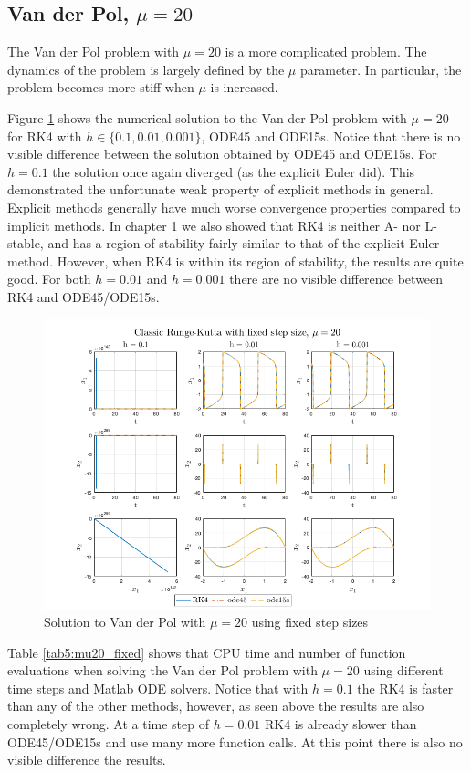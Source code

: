 \subsection{Van der Pol, $\mu = 20$}
The Van der Pol problem with $\mu = 20$ is a more complicated problem. The dynamics of the problem is largely defined by the $\mu$ parameter. In particular, the problem becomes more stiff when $\mu$ is increased.

Figure \ref{fig5:fixed_mu20} shows the numerical solution to the Van der Pol problem with $\mu = 20$ for RK4 with $h \in \{0.1, 0.01, 0.001\}$, ODE45 and ODE15s. Notice that there is no visible difference between the solution obtained by ODE45 and ODE15s. For $h=0.1$ the solution once again diverged (as the explicit Euler did). This demonstrated the unfortunate weak property of explicit methods in general. Explicit methods generally have much worse convergence properties compared to implicit methods. In chapter 1 we also showed that RK4 is neither A- nor L-stable, and has a region of stability fairly similar to that of the explicit Euler method. However, when RK4 is within its region of stability, the results are quite good. For both $h=0.01$ and $h=0.001$ there are no visible difference between RK4 and ODE45/ODE15s. 

\begin{figure}[H]
    \centering
    \includegraphics[width=\textwidth]{graphics/opg5/mu20_fixed.png}
    \caption{Solution to Van der Pol with $\mu = 20$ using fixed step sizes}
    \label{fig5:fixed_mu20}
\end{figure}

Table \ref{tab5:mu20_fixed} shows that CPU time and number of function evaluations when solving the Van der Pol problem with $\mu = 20$ using different time steps and Matlab ODE solvers. Notice that with $h=0.1$ the RK4 is faster than any of the other methods, however, as seen above the results are also completely wrong. At a time step of $h=0.01$ RK4 is already slower than ODE45/ODE15s and use many more function calls. At this point there is also no visible difference the results. 

